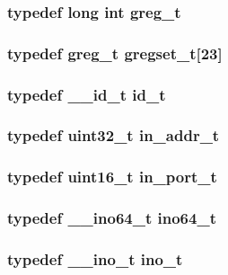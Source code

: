 \subsubsection[{greg\_\-t}]{\setlength{\rightskip}{0pt plus 5cm}typedef long int {\bf greg\_\-t}}\label{tp_8c_a010c51b4a56046c5af06ee32f68dc1ae}
\subsubsection[{gregset\_\-t}]{\setlength{\rightskip}{0pt plus 5cm}typedef {\bf greg\_\-t} {\bf gregset\_\-t}[23]}\label{tp_8c_a6a1ea464a63f35527147a8c2d0c00350}
\subsubsection[{id\_\-t}]{\setlength{\rightskip}{0pt plus 5cm}typedef {\bf \_\-\_\-id\_\-t} {\bf id\_\-t}}\label{tp_8c_a7f13a96f05e6a74e9b416154cbe5e2e2}
\subsubsection[{in\_\-addr\_\-t}]{\setlength{\rightskip}{0pt plus 5cm}typedef {\bf uint32\_\-t} {\bf in\_\-addr\_\-t}}\label{tp_8c_a98b38134a62f24554da0ffcabde8062c}
\subsubsection[{in\_\-port\_\-t}]{\setlength{\rightskip}{0pt plus 5cm}typedef {\bf uint16\_\-t} {\bf in\_\-port\_\-t}}\label{tp_8c_a979d51fa99f7145221b3ed1afff5b827}
\subsubsection[{ino64\_\-t}]{\setlength{\rightskip}{0pt plus 5cm}typedef {\bf \_\-\_\-ino64\_\-t} {\bf ino64\_\-t}}\label{tp_8c_a4e5202e9b9ec6abffa64bc4d0b3cfd26}
\subsubsection[{ino\_\-t}]{\setlength{\rightskip}{0pt plus 5cm}typedef {\bf \_\-\_\-ino\_\-t} {\bf ino\_\-t}}\label{tp_8c_a73341b7381d39d6e5b80ff9f23379dbd}
